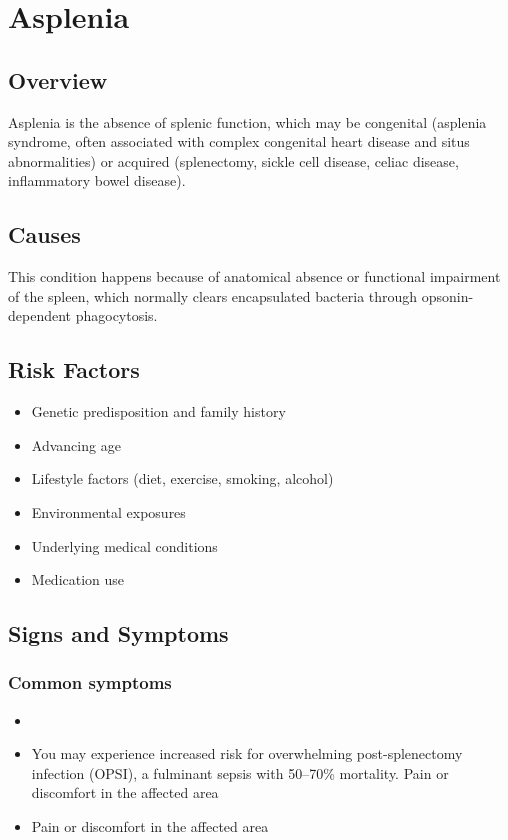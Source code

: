 \chapter{Asplenia}
\label{sec:Asplenia}

\section{Overview}
Asplenia is the absence of splenic function, which may be congenital (asplenia syndrome, often associated with complex congenital heart disease and situs abnormalities) or acquired (splenectomy, sickle cell disease, celiac disease, inflammatory bowel disease).
\section{Causes}
This condition happens because of anatomical absence or functional impairment of the spleen, which normally clears encapsulated bacteria through opsonin-dependent phagocytosis.     
\section{Risk Factors}

\begin{itemize}[noitemsep]
  \item Genetic predisposition and family history
  \item Advancing age
  \item Lifestyle factors (diet, exercise, smoking, alcohol)
  \item Environmental exposures
  \item Underlying medical conditions
  \item Medication use
\end{itemize}
\section{Signs and Symptoms}

\subsection{Common symptoms}
\begin{itemize}[noitemsep]
  \item \item You may experience increased risk for overwhelming post-splenectomy infection (OPSI), a fulminant sepsis with 50--70\% mortality. Pain or discomfort in the affected area    \item Pain or discomfort in the affected area
  \end{itemize}


